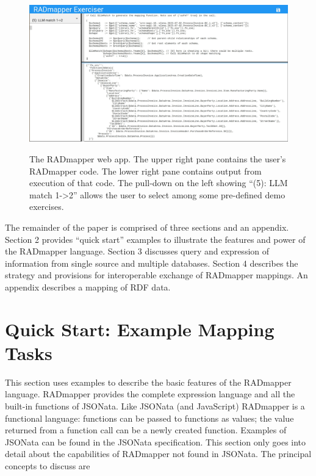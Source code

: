 \documentclass[10pt,letterpaper]{article} %
\begin{document}
\begin{figure}[H]
  \caption{The RADmapper web app. The upper right pane contains the user's RADmapper code.
    The lower right pane contains output from execution of that code.
    The pull-down on the left showing ``(5): LLM match 1-\textgreater 2'' allows the user to select among some pre-defined demo exercises.}
   \includegraphics[scale=0.173]{RADmapperScreenshot.jpg}
\label{fig:RM-screenshot}
  \centering
\end{figure}

The remainder of the paper is comprised of three sections and an appendix.
Section 2 provides ``quick start'' examples to illustrate the features and power of the RADmapper language.
Section 3 discusses query and expression of information from single source and multiple databases.
Section 4 describes the strategy and provisions for interoperable exchange of RADmapper mappings.
An appendix describes a mapping of RDF data.

\section{Quick Start: Example Mapping Tasks}
\label{sec:quick-start}

This section uses examples to describe the basic features of the RADmapper language.
RADmapper provides the complete expression language and all the built-in functions of JSONata.
Like JSONata (and JavaScript) RADmapper is a functional language: functions can be passed to functions as values; the value returned from a function call can be a newly created function.
Examples of JSONata can be found in the JSONata specification. %
This section only goes into detail about the capabilities of RADmapper not found in JSONata.
The principal concepts to discuss are
\end{document}
